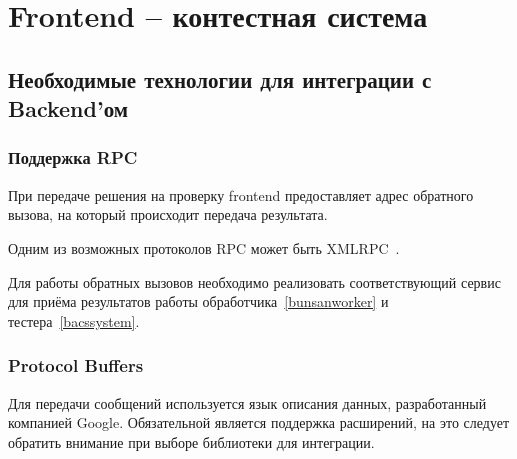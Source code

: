 \chapter{Frontend -- контестная система}

\section{Необходимые технологии для интеграции с Backend'ом}

\subsection{Поддержка RPC}
При передаче решения на проверку frontend предоставляет адрес обратного вызова,
на который происходит передача результата.

Одним из возможных протоколов RPC может быть XMLRPC~\cite{xmlrpc}.

Для работы обратных вызовов необходимо реализовать соответствующий сервис
для приёма результатов работы обработчика~\ref{bunsanworker} и тестера~\ref{bacssystem}.

\subsection{Protocol Buffers}
Для передачи сообщений используется язык описания данных, разработанный компанией Google.
Обязательной является поддержка расширений,
на это следует обратить внимание при выборе библиотеки для интеграции.
